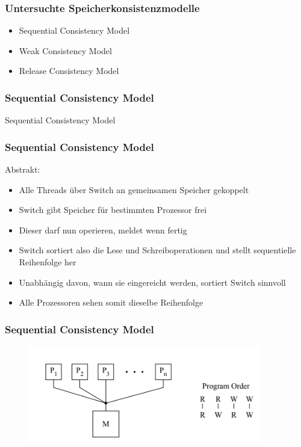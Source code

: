 \documentclass{sikslides}
\begin{document}
\begin{frame}
	\frametitle{Untersuchte Speicherkonsistenzmodelle}
  \begin{itemize}
  \item Sequential Consistency Model
\bigskip
  \item Weak Consistency Model
\bigskip
  \item Release Consistency Model
  \end{itemize}
\end{frame}
\begin{frame}
	\frametitle{Sequential Consistency Model}
Sequential Consistency Model
\end{frame}




\begin{frame}
	\frametitle{Sequential Consistency Model}
Abstrakt:
	\begin{itemize}
		\item Alle Threads über Switch an gemeinsamen Speicher gekoppelt
\bigskip
		\item Switch gibt Speicher für bestimmten Prozessor frei
\bigskip
		\item Dieser darf nun operieren, meldet wenn fertig
\bigskip
		\item Switch sortiert also die Lese und Schreiboperationen und stellt sequentielle Reihenfolge her
\bigskip
		\item Unabhängig davon, wann sie eingereicht werden, sortiert Switch sinnvoll 
\bigskip
		\item Alle Prozessoren sehen somit dieselbe Reihenfolge
	\end{itemize}
\end{frame}


\begin{frame}
	\frametitle{Sequential Consistency Model}
\begin{figure}[htbp] 
  \centering
  \includegraphics[width=0.9\textwidth]{figures/seqq.PNG}
  \label{Fig:gpum}
\end{figure}
\end{frame}
\end{document}
